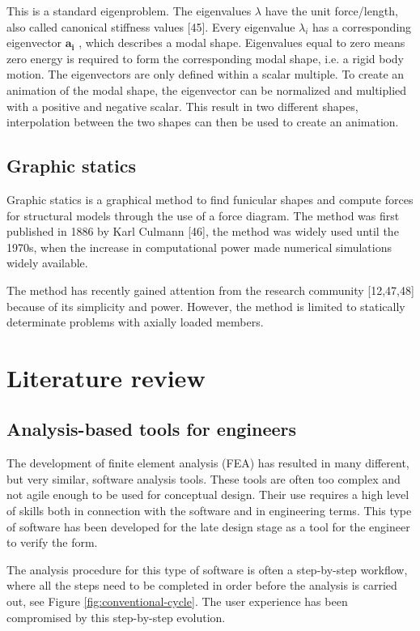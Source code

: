 This is a standard eigenproblem. The eigenvalues   $\lambda$ have the unit force/length, also called canonical stiffness values [45]. Every eigenvalue  $\lambda_i$ has a corresponding eigenvector   $\mathbf{a_i}$ , which describes a modal shape. Eigenvalues equal to zero means zero energy is required to form the corresponding modal shape, i.e. a rigid body motion. The eigenvectors are only defined within a scalar multiple. To create an animation of the modal shape, the eigenvector can be normalized and multiplied with a positive and negative scalar. This result in two different shapes, interpolation between the two shapes can then be used to create an animation.


\section{Graphic statics}
Graphic statics is a graphical method to find funicular shapes and compute forces for structural models through the use of a force diagram. The method was first published in 1886 by Karl Culmann [46], the method was widely used until the 1970s, when the increase in computational power made numerical simulations widely available. 

The method has recently gained attention from the research community [12,47,48] because of its simplicity and power. However, the method is limited to statically determinate problems with axially loaded members. 



\chapter{Literature review}
\label{ch:Literature review}
\section{Analysis-based tools for engineers}
The development of finite element analysis (FEA) has resulted in many different, but very similar, software analysis tools. These tools are often too complex and not agile enough to be used for conceptual design. Their use requires a high level of skills both in connection with the software and in engineering terms. This type of software has been developed for the late design stage as a tool for the engineer to verify the form. 

 The analysis procedure for this type of software is often a step-by-step workflow, where all the steps need to be completed in order before the analysis is carried out, see Figure \ref{fig:conventional-cycle}. The user experience has been compromised by this step-by-step evolution.

